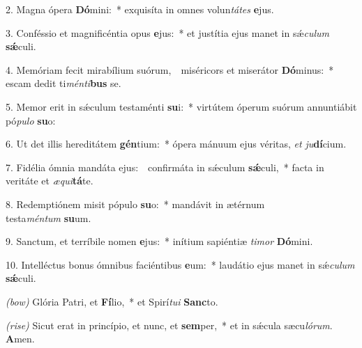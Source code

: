 2. Magna ópera \textbf{Dó}mini:~*
	exquisíta in omnes volun\textit{tá}\textit{tes} \textbf{e}jus.

3. Conféssio et magnificéntia opus \textbf{e}jus:~*
	et justítia ejus manet in s\'{\ae}\textit{cu}\-\textit{lum} \textbf{s\'{\ae}}culi.

4. Memóriam fecit mirabílium suórum,~{\color{red}\GreDagger}\
	miséricors et miserátor \textbf{Dó}\-minus:~*
	escam dedit ti\textit{mén}\textit{ti}\textbf{bus} se.

5. Memor erit in s\'{\ae}culum testaménti \textbf{su}i:~*
	virtútem óperum suórum annuntiábit pó\textit{pu}\textit{lo} \textbf{su}o:

6. Ut det illis hereditátem \textbf{gén}ti\-um:~*
	ópera mánuum ejus véritas, \textit{et} \textit{ju}\textbf{dí}\-cium.

7. Fidélia ómnia mandáta ejus:~{\color{red}\GreDagger}\
	confirmáta in s\'{\ae}culum \textbf{s\'{\ae}}culi,~*
	facta in veritáte et \textit{æ}\textit{qui}\textbf{tá}te.

8. Redemptiónem misit pópulo \textbf{su}o:~*
	mandávit in ætérnum\\ testa\textit{mén}\textit{tum} \textbf{su}um.

9. Sanctum, et terríbile nomen \textbf{e}jus:~*
	inítium sapiéntiæ \textit{ti}\textit{mor} \textbf{Dó}\-mini.

10. Intelléctus bonus ómnibus faciéntibus \textbf{e}um:~*
	laudátio ejus manet in s\'{\ae}\textit{cu}\textit{lum} \textbf{s\'{\ae}}culi.

{\color{red}\textit{(bow)}} Glória Patri, et \textbf{Fí}lio,~*
	et Spirí\textit{tu}\textit{i} \textbf{Sanc}to.

{\color{red}\textit{(rise)}} Sicut erat in princípio, et nunc, et \textbf{sem}per,~*
	et in s\'{\ae}cula sæcu\textit{ló}\textit{rum}. \textbf{A}men.